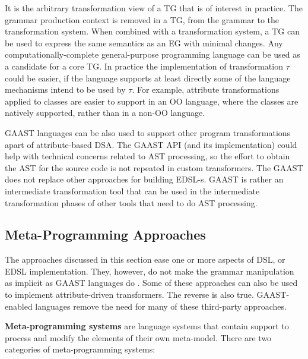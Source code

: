 It is the arbitrary transformation view of a TG that is of interest in practice. The grammar production context is removed in a TG, from the grammar to the transformation system. When combined with a transformation system, a TG can be used to express the same semantics as an EG with minimal changes. Any computationally-complete general-purpose programming language can be used as a candidate for a core TG. In practice the implementation of transformation $\tau$ could be easier, if the language supports at least directly some of the language mechanisms intend to be used by $\tau$. For example, attribute transformations applied to classes are easier to support in an OO language, where the classes are natively supported, rather than in a non-OO language. 

GAAST languages can be also used to support other program transformations apart of attribute-based DSA. The GAAST API (and its implementation) could help with technical concerns related to AST processing, so the effort to obtain the AST for the source code is not repeated in custom transformers. The GAAST does not replace other approaches for building EDSL-s. GAAST is rather an intermediate transformation tool that can be used in the intermediate transformation phases of other tools that need to do AST processing.

\subsection{Meta-Programming Approaches}
\label{sec.meta.prog}

The approaches discussed in this section \cite{java.openJava,batory98jts,www.self,java.jse,java.epp,java.maya} ease one or more aspects of DSL, or EDSL implementation. They, however, do not make the grammar manipulation as implicit as GAAST languages do . Some of these approaches can also be used to implement attribute-driven transformers. The reverse is also true. GAAST-enabled languages remove the need for many of these third-party approaches. 

\noindent \textbf{Meta-programming systems} are language systems that contain support to process and modify the elements of their own meta-model. There are two categories of meta-programming systems:

